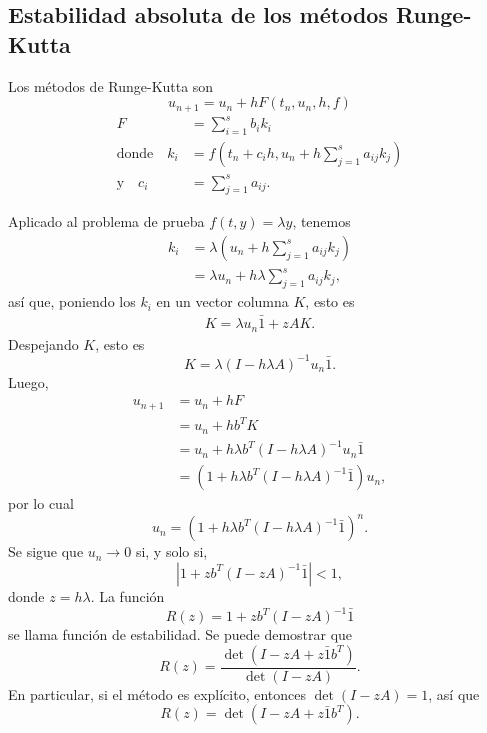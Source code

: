 \documentclass[11pt,letterpaper]{report}
\begin{document}
\subsection{Estabilidad absoluta de los métodos Runge-Kutta}

Los métodos de Runge-Kutta son
\begin{equation}
  u_{n+1} = u_n + h F(t_n,u_n,h,f)
\end{equation}
\begin{align}
  F
    &=
    \sum_{i=1}^{s}b_ik_i
  \\[-3mm]
  \text{donde} \quad
  k_i
    &= f(t_n+c_ih, u_n+h \sum_{j=1}^{s}a_{ij} k_j)
    \\[-4mm]
  \text{y} \quad
  c_i
    &= \sum_{j=1}^{s}a_{ij}
.\end{align}

Aplicado al problema de prueba $f(t,y)=\lambda y$, tenemos
\begin{align}
  k_i
  &= \lambda(u_n+h \sum_{j=1}^{s}a_{ij} k_j) \\
  &= \lambda u_n+h\lambda \sum_{j=1}^{s}a_{ij} k_j
,\end{align}
así que, poniendo los $k_i$ en un vector columna $K$, esto es
\begin{align}
  K = \lambda u_n\bar 1+zAK
.\end{align}
Despejando $K$, esto es
\begin{equation}
  K=\lambda (I-h\lambda A)^{-1}u_n\bar 1
.\end{equation}
Luego,
\begin{align}
  u_{n+1} 
  &= u_n + h F \\
  &= u_n + h b^{T}K \\
  &= u_n + h \lambda b^{T}(I-h\lambda A)^{-1}u_n\bar 1 \\
  &= (1 + h \lambda b^{T}(I-h\lambda A)^{-1}\bar 1)u_n
,\end{align}
por lo cual
\begin{equation}
  u_n = 
  (1 + h \lambda b^{T}(I-h\lambda A)^{-1}\bar 1)^{n}
.\end{equation}
Se sigue que $u_n\to 0$ si, y solo si,
\begin{equation}
  |1+zb^{T}(I-zA)^{-1}\bar 1|<1
,\end{equation}
donde $z=h\lambda$. La función
 \begin{equation}
  R(z) = 1+zb^{T}(I-zA)^{-1}\bar 1
\end{equation}
se llama función de estabilidad.
Se puede demostrar que
\begin{equation}
  R(z) = \frac{\det(I-zA+z\bar 1 b^{T})}{\det(I-zA)}
.\end{equation}
En particular, si el método es explícito, entonces $\det(I-zA)=1$,
así que
\begin{equation}
  R(z) = \det(I-zA+z\bar 1 b^{T})
.\end{equation}
\end{document}
